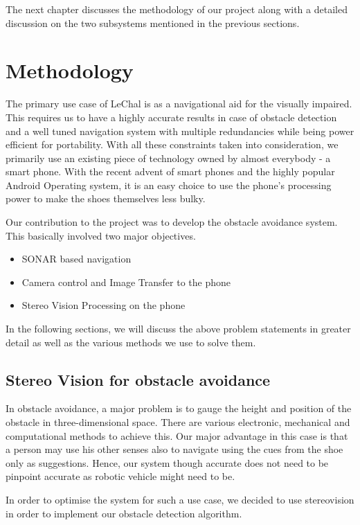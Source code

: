 \documentclass[11pt]{report}
\begin{document}
The next chapter discusses the methodology of our project along with a detailed discussion on the two subsystems mentioned in the previous sections.

\chapter{Methodology}

The primary use case of LeChal is as a navigational aid for the visually impaired. This requires us to have a highly accurate results in case of obstacle detection and a well tuned navigation system with multiple redundancies while being power efficient for portability. With all these constraints taken into consideration, we primarily use an existing piece of technology owned by almost everybody - a smart phone. With the recent advent of smart phones and the highly popular Android Operating system, it is an easy choice to use the phone's processing power to make the shoes themselves less bulky.

Our contribution to the project was to develop the obstacle avoidance system. This basically involved two major objectives.

\begin{itemize}
\item SONAR based navigation
\item Camera control and Image Transfer to the phone
\item Stereo Vision Processing on the phone
\end{itemize}        

In the following sections, we will discuss the above problem statements in greater detail as well as the various methods we use to solve them.

\section{Stereo Vision for obstacle avoidance}

In obstacle avoidance, a major problem is to gauge the height and position of the obstacle in three-dimensional space. There are various electronic, mechanical and computational methods to achieve this\cite{slam,infrared, thorpe1988vision}. Our major advantage in this case is that a person may use his other senses also to navigate using the cues from the shoe only as suggestions. Hence, our system though accurate does not need to be pinpoint accurate as robotic vehicle might need to be.

In order to optimise the system for such a use case, we decided to use stereovision\cite{gonzalez,hartley2000multiple} in order to implement our obstacle detection algorithm. 
\end{document}
